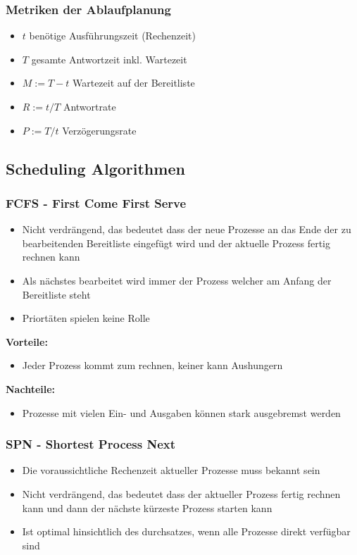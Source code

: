 \documentclass[10pt,a4paper]{article}
\begin{document}
\begin{multicols*}{4}
\subsubsection{Metriken der Ablaufplanung}\label{subsubsec:metriken-ablaufplanung}
\begin{itemize}
	\item \(t\) benötige Ausführungszeit (Rechenzeit)
	\item \(T\) gesamte Antwortzeit inkl. Wartezeit
	\item \(M := T -t\) Wartezeit auf der Bereitliste
	\item \(R := t / T\) Antwortrate
	\item \(P := T / t\) Verzögerungsrate
\end{itemize}

\subsection{Scheduling Algorithmen}
\subsubsection*{FCFS - First Come First Serve}
\begin{itemize}
	\item Nicht verdrängend, das bedeutet dass der neue Prozesse an das Ende der zu bearbeitenden
	      Bereitliste eingefügt wird und der aktuelle Prozess fertig rechnen kann
	\item Als nächstes bearbeitet wird immer der Prozess welcher am Anfang der Bereitliste steht
	\item Priortäten spielen keine Rolle
\end{itemize}
\textbf{\small Vorteile:}\hfill
\begin{itemize}
	\item Jeder Prozess kommt zum rechnen, keiner kann Aushungern
\end{itemize}
\textbf{\small Nachteile:}\hfill
\begin{itemize}
	\item Prozesse mit vielen Ein- und Ausgaben können stark ausgebremst werden
\end{itemize}
\subsubsection*{SPN - Shortest Process Next}
\begin{itemize}
	\item Die voraussichtliche Rechenzeit aktueller Prozesse muss bekannt sein
	\item Nicht verdrängend, das bedeutet dass der aktueller Prozess fertig rechnen kann und
	      dann der nächste kürzeste Prozess starten kann
	\item Ist optimal hinsichtlich des durchsatzes, wenn alle Prozesse direkt verfügbar sind
\end{itemize}

\end{multicols*}
\end{document}
